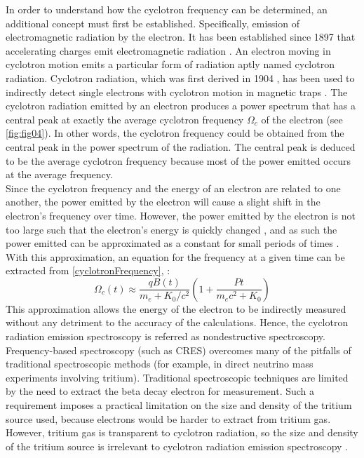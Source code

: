 \documentclass[a4paper,12pt, notitlepage]{article}
\begin{document}
In order to understand how the cyclotron frequency can be determined, an additional concept must first be established. Specifically, emission of electromagnetic radiation by the electron. It has been established since 1897 that accelerating charges emit electromagnetic radiation \cite{Larmor1897}. An electron moving in cyclotron motion emits a particular form of radiation aptly named cyclotron radiation. Cyclotron radiation, which was first derived in 1904 \cite{Heaviside1904}, has been used to indirectly detect single electrons with cyclotron motion in magnetic traps \cite{VanDyck1977}. The cyclotron radiation emitted by an electron produces a power spectrum that has a central peak at exactly the average cyclotron frequency $\Omega_{c}$ of the electron \cite{Asner2015, Monreal2009} (see \cref{fig:fig04}). In other words, the cyclotron frequency could be obtained from the central peak in the power spectrum of the radiation. The central peak is deduced to be the average cyclotron frequency because most of the power emitted occurs at the average frequency. \\
Since the cyclotron frequency and the energy of an electron are related to one another, the power emitted by the electron will cause a slight shift in the electron's frequency over time. However, the power emitted by the electron is not too large such that the electron's energy is quickly changed \cite{Monreal2009}, and as such the power emitted can be approximated as a constant for small periods of times \cite{Ashtari2019}. With this approximation, an equation for the frequency at a given time can be extracted from \cref{cyclotronFrequency}, \cite{Ashtari2019}: 
\begin{equation}
    \Omega_{c}(t) \approx \dfrac{qB(t)}{m_{e} + K_{0} / c^{2}} \left( 1
    + \dfrac{Pt}{m_{e}c^{2} + K_{0}}\right)
\end{equation}
This approximation allows the energy of the electron to be indirectly measured without any detriment to the accuracy of the calculations. Hence, the cyclotron radiation emission spectroscopy is referred as nondestructive spectroscopy. 
Frequency-based spectroscopy (such as CRES) overcomes many of the pitfalls of traditional spectroscopic methods (for example, in direct neutrino mass experiments involving tritium). Traditional spectroscopic techniques are limited by the need to extract the beta decay electron for measurement. Such a requirement imposes a practical limitation on the size and density of the tritium source used, because electrons would be harder to extract from tritium gas. However, tritium gas is transparent to cyclotron radiation, so the size and density of the tritium source is irrelevant to cyclotron radiation emission spectroscopy \cite{Asner2015}. \\
\end{document}
